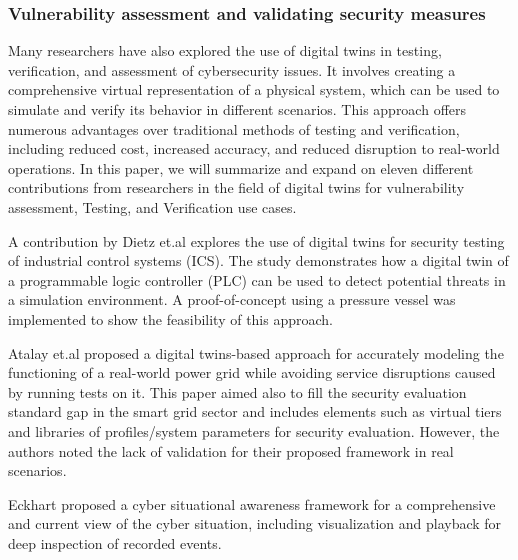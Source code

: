 \subsubsection{Vulnerability assessment and validating security measures}

Many researchers have also explored the use of digital twins in testing, verification, and assessment of cybersecurity issues. It involves creating a comprehensive virtual representation of a physical system, which can be used to simulate and verify its behavior in different scenarios. This approach offers numerous advantages over traditional methods of testing and verification, including reduced cost\cite{franciaDigitalTwinsIndustrial2021, jiaqiliSpaceSpiderHyper2022, shitoleRealTimeDigitalTwin2021, maillet-contozEndtoendSecurityValidation2020}, increased accuracy\cite{sugumarAssessmentMethodDetecting2019, atalayDigitalTwinsApproach2020}, and reduced disruption \cite{franciaDigitalTwinsIndustrial2021, atalayDigitalTwinsApproach2020, adrienbacueDigitalTwinsEnhanced2022} to real-world operations.  
In this paper, we will summarize and expand on eleven different contributions from researchers in the field of digital twins for vulnerability assessment, Testing, and Verification use cases.  

A contribution by Dietz et.al\cite{dietzEmployingDigitalTwins2022} explores the use of digital twins for security testing of industrial control systems (ICS). The study demonstrates how a digital twin of a programmable logic controller (PLC) can be used to detect potential threats in a simulation environment. A proof-of-concept using a pressure vessel was implemented to show the feasibility of this approach.  

Atalay et.al \cite{atalayDigitalTwinsApproach2020} proposed a digital twins-based approach for accurately modeling the functioning of a real-world power grid while avoiding service disruptions caused by running tests on it. This paper aimed also to fill the security evaluation standard gap in the smart grid sector and includes elements such as virtual tiers and libraries of profiles/system parameters for security evaluation. However, the authors noted the lack of validation for their proposed framework in real scenarios.  

Eckhart \cite{eckhartEnhancingCyberSituational2019} proposed a cyber situational awareness framework for a comprehensive and current view of the cyber situation, including visualization and playback for deep inspection of recorded events.  


